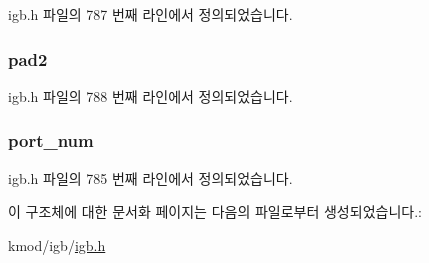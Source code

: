 igb.\+h 파일의 787 번째 라인에서 정의되었습니다.

\subsubsection[{\texorpdfstring{pad2}{pad2}}]{ pad2}\hypertarget{structe1000__fw__drv__info_a3ff067b94e2ab4a981c90c8a7920c521}{}\label{structe1000__fw__drv__info_a3ff067b94e2ab4a981c90c8a7920c521}


igb.\+h 파일의 788 번째 라인에서 정의되었습니다.

\subsubsection[{\texorpdfstring{port\+\_\+num}{port_num}}]{ port\+\_\+num}\hypertarget{structe1000__fw__drv__info_ab89764d4931eca8a703e4864c390e725}{}\label{structe1000__fw__drv__info_ab89764d4931eca8a703e4864c390e725}


igb.\+h 파일의 785 번째 라인에서 정의되었습니다.



이 구조체에 대한 문서화 페이지는 다음의 파일로부터 생성되었습니다.\+:\begin{DoxyCompactItemize}
\item 
kmod/igb/\hyperlink{kmod_2igb_2igb_8h}{igb.\+h}\end{DoxyCompactItemize}
